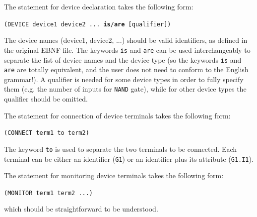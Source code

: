 \documentclass[12pt]{article}
\def\n{\noindent}
\begin{document}
\n The statement for device declaration takes the following form:

\vspace{0.5cm} \texttt{(DEVICE device1 device2 ... \textbf{is}/\textbf{are}
   [qualifier])} \vspace{0.5cm}

\n The device names (device1, device2, ...) should be valid identifiers, as
defined in the original EBNF file. The keywords \texttt{is} and \texttt{are} can
be used interchangeably to separate the list of device names and the device type
(so the keywords \texttt{is} and \texttt{are} are totally equivalent, and the
user does not need to conform to the English grammar!). A qualifier is needed
for some device types in order to fully specify them (e.g. the number of inputs
for \texttt{NAND} gate), while for other device types the qualifier should be
omitted. \vspace{0.3cm}

\n The statement for connection of device terminals takes the following form:

\vspace{0.5cm} \texttt{(CONNECT term1 to term2)} \vspace{0.5cm}

\n The keyword \texttt{to} is used to separate the two terminals to be connected.
Each terminal can be either an identifier (\texttt{G1}) or an identifier plus
its attribute (\texttt{G1.I1}).
\vspace{0.3cm}

\n The statement for monitoring device terminals takes the following form:

\vspace{0.5cm} \texttt{(MONITOR term1 term2 ...)} \vspace{0.5cm}

\n which should be straightforward to be understood.
\end{document}
